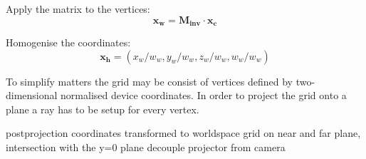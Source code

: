 Apply the matrix to the vertices:
\begin{equation}
 \mathbf{x_{w}} = \mathbf{M_{inv}} \cdot \mathbf{x_{c}}
\end{equation}

Homogenise the coordinates:
\begin{equation}
 \mathbf{x_{h}} = (x_{w}/w_{w}, y_{w}/w_{w}, z_{w}/w_{w}, w_{w}/w_{w})
\end{equation}

To simplify matters the grid may be consist of vertices defined by
two-dimensional normalised device coordinates. In order to project the grid
onto a plane a ray has to be setup for every vertex.

postprojection coordinates transformed to worldspace
grid on near and far plane, intersection with the y=0 plane
decouple projector from camera
